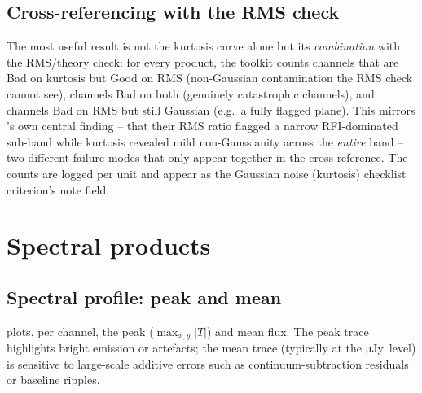 \documentclass[11pt,a4paper]{article}
\begin{document}
\subsection{Cross-referencing with the RMS check}
The most useful result is not the kurtosis curve alone but its
\emph{combination} with the RMS/theory check: for every product, the toolkit
counts channels that are \textsf{Bad} on kurtosis but \textsf{Good} on RMS
(non-Gaussian contamination the RMS check cannot see), channels \textsf{Bad} on
both (genuinely catastrophic channels), and channels \textsf{Bad} on RMS but
still Gaussian (e.g.\ a fully flagged plane). This mirrors
\citeauthor{luber2025}'s own central finding -- that their RMS ratio flagged a
narrow RFI-dominated sub-band while kurtosis revealed mild non-Gaussianity
across the \emph{entire} band -- two different failure modes that only appear
together in the cross-reference. The counts are logged per unit and appear as
the \textsf{Gaussian noise (kurtosis)} checklist criterion's note field.

\section{Spectral products}\label{sec:spectral}
\subsection{Spectral profile: peak and mean}
 plots, per channel, the peak
($\max_{x,y}|T|$) and mean flux. The peak trace highlights bright emission or
artefacts; the mean trace (typically at the \si{\micro Jy}\ level) is sensitive
to large-scale additive errors such as continuum-subtraction residuals or
baseline ripples.
\end{document}
